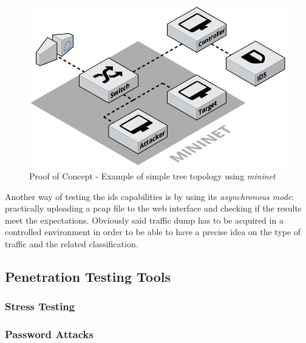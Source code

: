 \begin{figure}[h!]
    \centering
    \includegraphics[scale=0.25]{assets/figures/chapter3/PoC_topology.png}
    \caption{Proof of Concept - Example of simple tree topology using \textit{mininet}}
    \label{fig:poc-topology}
\end{figure}
Another way of testing the \gls{ids} capabilities is by using its \textit{asynchronous mode}: practically uploading a \gls{pcap} file to the web interface and checking if the results meet the expectations. Obviously said traffic dump has to be acquired in a controlled environment in order to be able to have a precise idea on the type of traffic and the related classification.


\subsection{Penetration Testing Tools}
\label{subsec:pentesting-tools}
\textcolor{dimgray}{\lipsum[1]}

\subsubsection{Stress Testing}
\label{subsubsec:stress-testing}
\textcolor{dimgray}{\lipsum[1]}

\subsubsection{Password Attacks}
\label{subsubsec:password-attacks}
\textcolor{dimgray}{\lipsum[1]}

